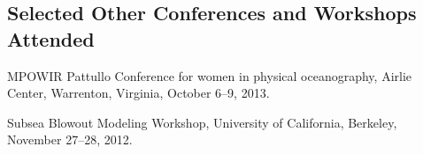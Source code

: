 \documentclass[10pt,letterpaper]{article}
\renewenvironment{itemize}{
  \begin{list}{}{
    \setlength{\leftmargin}{1.5em}
    \setlength{\itemsep}{0.25em}
    \setlength{\parskip}{0pt}
    \setlength{\parsep}{0.25em}
  }
}{
  \end{list}
}
\begin{document}
\subsection*{Selected Other Conferences and Workshops Attended}

\begin{itemize}

\item MPOWIR Pattullo Conference for women in physical oceanography, Airlie Center, Warrenton, Virginia, October 6--9, 2013.





\item Subsea Blowout Modeling Workshop, University of California, Berkeley, November 27--28, 2012.







\end{itemize}
\end{document}
